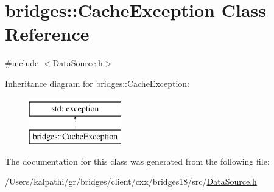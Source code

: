\hypertarget{classbridges_1_1_cache_exception}{}\section{bridges\+:\+:Cache\+Exception Class Reference}
\label{classbridges_1_1_cache_exception}


{\ttfamily \#include $<$Data\+Source.\+h$>$}

Inheritance diagram for bridges\+:\+:Cache\+Exception\+:\begin{figure}[H]
\begin{center}
\leavevmode
\includegraphics[height=2.000000cm]{classbridges_1_1_cache_exception}
\end{center}
\end{figure}


The documentation for this class was generated from the following file\+:\begin{DoxyCompactItemize}
\item 
/\+Users/kalpathi/gr/bridges/client/cxx/bridges18/src/\mbox{\hyperlink{_data_source_8h}{Data\+Source.\+h}}\end{DoxyCompactItemize}
